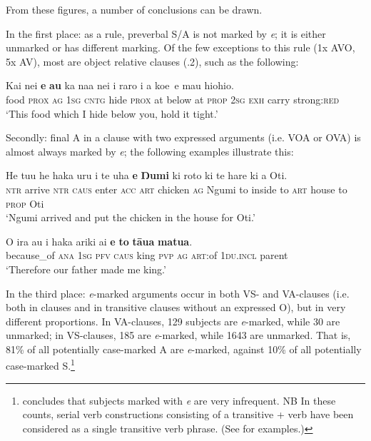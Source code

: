 From these figures, a number of conclusions can be drawn. 

In the first place: as a rule, preverbal S/A is not marked by \textit{e}; it is either unmarked or has different marking. Of the few exceptions to this rule (1x AVO, 5x AV), most are object relative clauses (.2), such as the following:

\ea\label{ex:8.8}
\gll Kai nei {\ob}\textbf{e} \textbf{au} ka na{\ꞌ}a nei {\ꞌ}i raro i a koe\,{\cb} e ma{\ꞌ}u hiohio.\\
food \textsc{prox} {\db}\textsc{ag} \textsc{1sg} \textsc{cntg} hide \textsc{prox} at below at \textsc{prop} \textsc{2sg} \textsc{exh} carry strong:\textsc{red}\\

\glt 
‘This food which I hide below you, hold it tight.’ \textstyleExampleref{[R310.074]} 
\z

Secondly: final A in a clause with two expressed arguments (i.e. VOA or OVA) is almost always marked by \textit{e}; the following examples illustrate this:

\ea\label{ex:8.9}
\gll He tu{\ꞌ}u he haka uru i te {\ꞌ}uha \textbf{e} \textbf{Ŋumi} ki roto ki te hare  ki a Oti.\\
\textsc{ntr} arrive \textsc{ntr} \textsc{caus} enter \textsc{acc} \textsc{art} chicken \textsc{ag} Ngumi to inside to \textsc{art} house  to \textsc{prop} Oti\\

\glt 
‘Ngumi arrived and put the chicken in the house for Oti.’ \textstyleExampleref{[MsE-105b.004]}
\z

\ea\label{ex:8.10}
\gll {\ꞌ}O ira au i haka {\ꞌ}ariki ai \textbf{e} \textbf{to} \textbf{tāua} \textbf{matu{\ꞌ}a}.\\
because\_of \textsc{ana} \textsc{1sg} \textsc{pfv} \textsc{caus} king \textsc{pvp} \textsc{ag} \textsc{art}:of \textsc{1du.incl} parent\\

\glt 
‘Therefore our father made me king.’ \textstyleExampleref{[Ley-2-06.03]}
\z

In the third place: \textit{e}{}-marked arguments occur in both VS- and VA-clauses (i.e. both in  clauses and in transitive clauses without an expressed O), but in very different proportions. In VA-clauses, 129 subjects are \textit{e}{}-marked, while 30 are unmarked; in VS-clauses, 185 are \textit{e}{}-marked, while 1643 are unmarked. That is, 81\% of all potentially case-marked A are \textit{e}{}-marked, against 10\% of all potentially case-marked S.\footnote{\label{fn:390}\citet[39]{WeberN2003} concludes that  subjects marked with \textit{e} are very infrequent. 
NB In these counts, serial verb constructions consisting of a transitive +  verb have been considered as a single transitive verb phrase. (See \citealt[39]{WeberN2003} for examples.)} 


